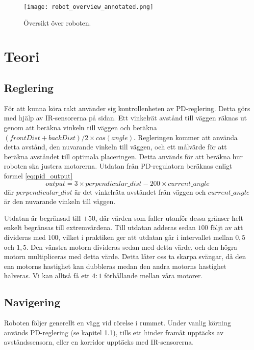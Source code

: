 \documentclass[a4paper,11pt]{article}
\begin{document}
\begin{figure}[h!]
    \centering
    \texttt{[image: robot\_overview\_annotated.png]}
    \caption{Översikt över roboten.}
    \label{fig:robot_overview}
\end{figure}

\clearpage
\section{Teori}
\subsection{Reglering}
\label{ssec:pid}

För att kunna köra rakt använder sig kontrollenheten av PD-reglering. Detta görs med hjälp av IR-sensorerna på sidan. Ett vinkelrät avstånd till väggen räknas ut genom att beräkna vinkeln till väggen och beräkna $ (frontDist+backDist)/2 \times cos(angle)$. Regleringen kommer att använda detta avstånd, den nuvarande vinkeln till väggen, och ett målvärde för att beräkna avståndet till optimala placeringen. Detta används för att beräkna hur roboten ska justera motorerna. Utdatan från PD-regulatorn beräknas enligt formel \ref{eq:pid_output}
\begin{equation}\label{eq:pid_output}
output = 3 \times perpendicular\_dist - 200 \times current\_angle
\end{equation}
där $perpendicular\_dist$ är det vinkelräta avståndet från väggen och $current\_angle$ är den nuvarande vinkeln till väggen.

Utdatan är begränsad till $\pm 50$, där värden som faller utanför dessa gränser helt enkelt begränsas till extremvärdena. Till utdatan adderas sedan $100$ följt av att divideras med $100$, vilket i praktiken ger att utdatan går i intervallet mellan $0,5$ och $1,5$. Den vänstra motorn divideras sedan med detta värde, och den högra motorn multipliceras med detta värde. Detta låter oss ta skarpa svängar, då den ena motorns hastighet kan dubbleras medan den andra motorns hastighet halveras. Vi kan alltså få ett $4:1$ förhållande mellan våra motorer.

\subsection{Navigering}
Roboten följer generellt en vägg vid rörelse i rummet. Under vanlig körning används PD-reglering (se kapitel \ref{ssec:pid}), tills ett hinder framåt upptäcks av avståndssensorn, eller en korridor upptäcks med IR-sensorerna.
\end{document}
